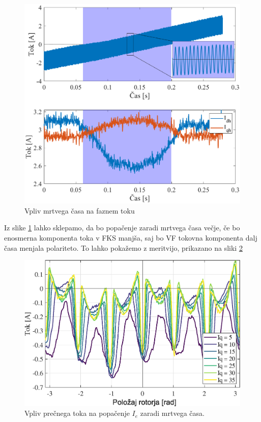 \documentclass[a4paper,twoside,openright,12pt,slovene]{book}
\begin{document}
\begin{figure}[!htbp]
    \centering
    \includegraphics[width=0.9\columnwidth]{Slike/mrtviCasFazniTok.eps}
    \caption{\label{mrtviCasFazniTok} Vpliv mrtvega časa na faznem toku }
\end{figure}

Iz slike \ref{mrtviCasFazniTok} lahko sklepamo, da bo popačenje zaradi mrtvega časa večje, če bo enosmerna komponenta toka v FKS manjša, saj bo VF tokovna komponenta dalj časa menjala polariteto. To
lahko pokažemo z meritvijo, prikazano na sliki 
\ref{tokovniOdzivIs_HKSslediRKS_IdiffAmp_DT}

\begin{figure}[!htbp]
    \centering
    \includegraphics[width=0.75\columnwidth]{Slike/tokovniOdzivIs_HKSslediRKS_IdiffAmp_DT.eps}
    \caption{\label{tokovniOdzivIs_HKSslediRKS_IdiffAmp_DT} Vpliv prečnega toka na popačenje $I_e$ zaradi mrtvega časa. }
\end{figure}
\end{document}
